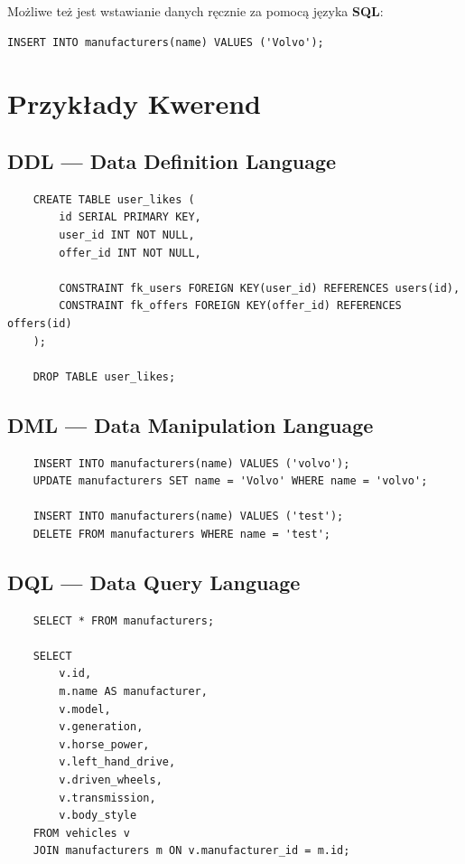 \documentclass[a4paper,11pt]{article}
\begin{document}
Możliwe też jest wstawianie danych ręcznie za pomocą języka \textbf{SQL}:

\begin{verbatim}
INSERT INTO manufacturers(name) VALUES ('Volvo');
\end{verbatim}

\section*{Przykłady Kwerend}
\subsection*{DDL --- Data Definition Language}
\begin{verbatim}
    CREATE TABLE user_likes (
        id SERIAL PRIMARY KEY,
        user_id INT NOT NULL,
        offer_id INT NOT NULL,
        
        CONSTRAINT fk_users FOREIGN KEY(user_id) REFERENCES users(id),
        CONSTRAINT fk_offers FOREIGN KEY(offer_id) REFERENCES offers(id)
    );

    DROP TABLE user_likes;
\end{verbatim}

\subsection*{DML --- Data Manipulation Language}
\begin{verbatim}
    INSERT INTO manufacturers(name) VALUES ('volvo');
    UPDATE manufacturers SET name = 'Volvo' WHERE name = 'volvo';

    INSERT INTO manufacturers(name) VALUES ('test');
    DELETE FROM manufacturers WHERE name = 'test';
\end{verbatim}

\pagebreak
\subsection*{DQL --- Data Query Language}
\begin{verbatim}
    SELECT * FROM manufacturers;

    SELECT 
        v.id, 
        m.name AS manufacturer,
        v.model,
        v.generation,
        v.horse_power,
        v.left_hand_drive,
        v.driven_wheels,
        v.transmission,
        v.body_style
    FROM vehicles v
    JOIN manufacturers m ON v.manufacturer_id = m.id;
\end{verbatim}
\end{document}
